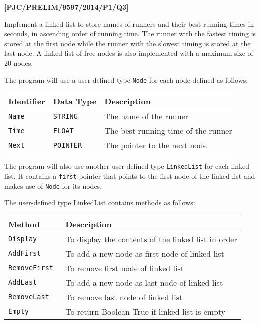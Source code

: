\item \textbf{{[}PJC/PRELIM/9597/2014/P1/Q3{]} }

Implement a linked list to store names of runners and their best running
times in seconds, in ascending order of running time. The runner with
the fastest timing is stored at the first node while the runner with
the slowest timing is stored at the last node. A linked list of free
nodes is also implemented with a maximum size of 20 nodes. 

The program will use a user-defined type \texttt{Node} for each node
defined as follows: 
\begin{center}
\begin{tabular}{|l|l|l|}
\hline 
\texttt{\textbf{\hspace{0.01\columnwidth}}}\textbf{Identifier} & \texttt{\textbf{\hspace{0.01\columnwidth}}}\textbf{Data Type} & \texttt{\textbf{\hspace{0.05\columnwidth}}}\textbf{Description}\tabularnewline
\hline 
\texttt{Name} & \texttt{STRING} & The name of the runner\tabularnewline
\hline 
\texttt{Time} & \texttt{FLOAT} & The best running time of the runner\tabularnewline
\hline 
\texttt{Next} & \texttt{POINTER} & The pointer to the next node \tabularnewline
\hline 
\end{tabular}
\par\end{center}

The program will also use another user-defined type \texttt{LinkedList}
for each linked list. It contains a \texttt{first} pointer that points
to the first node of the linked list and makes use of \texttt{Node}
for its nodes. 

The user-defined type LinkedList contains methods as follows: 
\begin{center}
\begin{tabular}{|l|l|}
\hline 
\texttt{\textbf{\hspace{0.01\columnwidth}}}\textbf{Method} & \texttt{\textbf{\hspace{0.05\columnwidth}}}\textbf{Description}\tabularnewline
\hline 
\texttt{Display } & To display the contents of the linked list in order \tabularnewline
\hline 
\texttt{AddFirst } & To add a new node as first node of linked list\tabularnewline
\hline 
\texttt{RemoveFirst } & To remove first node of linked list\tabularnewline
\hline 
\texttt{AddLast} & To add a new node as last node of linked list \tabularnewline
\hline 
\texttt{RemoveLast} & To remove last node of linked list\tabularnewline
\hline 
\texttt{Empty} & To return Boolean True if linked list is empty\tabularnewline
\hline 
\end{tabular}
\par\end{center}

